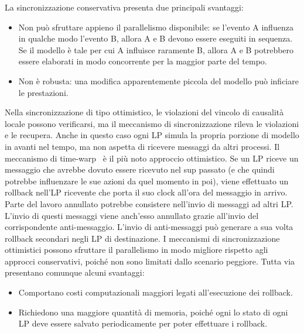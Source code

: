 La sincronizzazione conservativa presenta due principali svantaggi: 
\begin{itemize}
    \item Non può sfruttare appieno il parallelismo disponibile: se l'evento A influenza in qualche modo l'evento B, allora A e B devono essere eseguiti in sequenza. Se il modello è tale per cui A influisce raramente B, allora A e B potrebbero essere elaborati in modo concorrente per la maggior parte del tempo.
    \item Non è robusta: una modifica apparentemente piccola del modello può inficiare le prestazioni. 
\end{itemize}
Nella sincronizzazione di tipo ottimistico, le violazioni del vincolo di causalità locale possono verificarsi, ma il meccanismo di sincronizzazione rileva le violazioni e le recupera. Anche in questo caso ogni LP simula la propria porzione di modello in avanti nel tempo, ma non aspetta di ricevere messaggi da altri processi. 
Il meccanismo di time-warp~\cite{DBLP:journals/toplas/Jefferson85} è il più noto approccio ottimistico. Se un LP riceve un messaggio che avrebbe dovuto essere ricevuto nel sup passato (e che quindi potrebbe influenzare le sue azioni da quel momento in poi), viene effettuato un rollback nell'LP ricevente che porta il suo clock all'ora del messaggio in arrivo.
Parte del lavoro annullato potrebbe consistere nell'invio di messaggi ad altri LP. L'invio di questi messaggi viene anch'esso annullato grazie all'invio del corrispondente anti-messaggio. L'invio di anti-messaggi può generare a sua volta rollback secondari negli LP di destinazione.
I meccanismi di sincronizzazione ottimistici possono sfruttare il parallelismo in modo migliore rispetto agli approcci conservativi, poiché non sono limitati dallo scenario peggiore. Tutta via presentano comunque alcuni svantaggi: 
\begin{itemize}
    \item Comportano costi computazionali maggiori legati all'esecuzione dei rollback. 
    \item Richiedono una maggiore quantità di memoria, poiché ogni lo stato di ogni LP deve essere salvato periodicamente per poter effettuare i rollback.
\end{itemize}